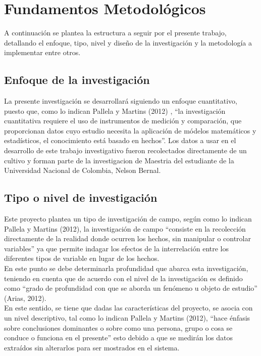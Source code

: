 \chapter{Fundamentos Metodol\'ogicos}

	A continuaci\'on se plantea la estructura a seguir por el presente trabajo, detallando el enfoque, tipo, nivel y dise\~no de la investigaci\'on y la metodolog\'ia a implementar entre otros.
	
\section{Enfoque de la investigaci\'on}
	
	La presente investigaci\'on se desarrollar\'a siguiendo un enfoque cuantitativo, puesto que, como lo indican Pallela y  Martins (2012) , “la investigaci\'on cuantitativa requiere el uso de instrumentos de medici\'on y comparaci\'on, que proporcionan datos cuyo estudio necesita la aplicaci\'on de m\'odelos matem\'aticos y estad\'isticos, el conocimiento est\'a basado en hechos”.  Los datos a usar en el desarrollo de este trabajo investigativo fueron recolectados directamente de un cultivo y forman parte de la investigacion de Maestria del estudiante de la Universidad Nacional de Colombia, Nelson Bernal.\\
	
\section{Tipo o nivel de investigaci\'on}
	
	Este proyecto plantea un tipo de investigaci\'on de campo, seg\'un como lo indican Pallela y  Martins (2012),  la investigaci\'on de campo “consiste en la recolecci\'on directamente de la realidad donde ocurren los hechos, sin manipular o controlar variables” ya que permite indagar los efectos de la interrelaci\'on entre los diferentes tipos de variable en lugar de los hechos.\\

	En este punto se debe determinarla profundidad que abarca esta investigaci\'on, teniendo en cuenta que de acuerdo con  el nivel de la investigaci\'on es definido como “grado de profundidad con que se aborda un fen\'omeno u objeto de estudio” (Arias, 2012).\\

	En este sentido, se tiene que dadas las caracter\'isticas del proyecto, se asocia con un nivel descriptivo, tal como lo indican Pallela y  Martins (2012),  “hace \'enfasis sobre conclusiones dominantes o sobre como una persona, grupo o cosa se conduce o funciona en el presente” esto debido a que se medir\'an los datos extra\'idos sin alterarlos para ser mostrados en el sistema.\\

